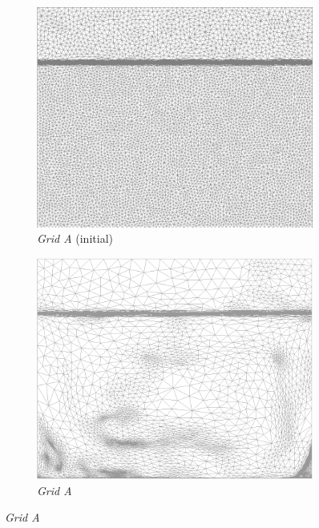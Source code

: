 \begin{figure}[htbp]
\centering
  \begin{subfigure}[t]{0.3\textwidth}
    \centering
    \includegraphics[width=\textwidth]{Chapter5/Graphics/2d/GridAinit.png}
    \caption{\emph{Grid A} (initial)}
    \label{fig:gridAinit}
  \end{subfigure}
  \begin{subfigure}[t]{0.3\textwidth}
    \centering
    \includegraphics[width=\textwidth]{Chapter5/Graphics/2d/GridA.png}
    \caption{\emph{Grid A}}

\end{subfigure}
\end{figure}

